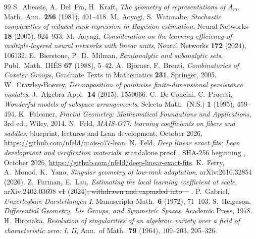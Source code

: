\documentclass[11pt,a4paper]{article}
\theoremstyle{definition}
\theoremstyle{remark}
\numberwithin{equation}{section}
\providecommand{\DIFdeltex}[1]{{\protect\color{red}\sout{#1}}} %
\providecommand{\DIFdelbegin}{} %
\providecommand{\DIFdelend}{} %
\providecommand{\DIFdel}[1]{\texorpdfstring{\DIFdeltex{#1}}{}} %
\begin{document}
\begin{thebibliography}{99}
 S.~Abeasis, A.~Del~Fra, H.~Kraft, \emph{The geometry of representations of $A_m$}, Math.\ Ann.\ \textbf{256} (1981), 401--418.
 M.~Aoyagi, S.~Watanabe, \emph{Stochastic complexities of reduced rank regression in Bayesian estimation}, Neural Networks \textbf{18} (2005), 924--933.
 M.~Aoyagi, \emph{Consideration on the learning efficiency of multiple-layered neural networks with linear units}, Neural Networks \textbf{172} (2024), 106132.
 E.~Bierstone, P.~D.~Milman, \emph{Semianalytic and subanalytic sets}, Publ.\ Math.\ IHÉS \textbf{67} (1988), 5--42.
 A.~Björner, F.~Brenti, \emph{Combinatorics of Coxeter Groups}, Graduate Texts in Mathematics \textbf{231}, Springer, 2005.
 W.~Crawley-Boevey, \emph{Decomposition of pointwise finite-dimensional persistence modules}, J.\ Algebra Appl.\ \textbf{14} (2015), 1550066.
 C.~De Concini, C.~Procesi, \emph{Wonderful models of subspace arrangements}, Selecta Math.\ (N.S.) \textbf{1} (1995), 459--494.
 K.~Falconer, \emph{Fractal Geometry: Mathematical Foundations and Applications}, 3rd ed., Wiley, 2014.
 N.~Feld, \emph{MAIS-O77: learning coefficients on fibers and saddles}, blueprint, lectures and Lean development, October 2026, \url{https://github.com/nfeld/mais-o77-lean}.
 N.~Feld, \emph{Deep linear exact fits: Lean development and verification materials}, standalone proof , SHA-256 beginning , October 2026, \url{https://github.com/nfeld/deep-linear-exact-fits}.
 K.~Ferry, A.~Monod, K.~Yano, \emph{Singular geometry of low-rank adaptation}, arXiv:2610.32854 (2026).
 Z.~Furman, E.~Lau, \emph{Estimating the local learning coefficient at scale}, arXiv:2402.03698 \DIFdelbegin \DIFdel{v1 }\DIFdelend (2024)\DIFdelbegin \DIFdel{; withdrawn and expanded into~\mbox{%
\cite{lau-llc}}\hskip0pt%
}\DIFdelend .
 P.~Gabriel, \emph{Unzerlegbare Darstellungen I}, Manuscripta Math.\ \textbf{6} (1972), 71--103.
 S.~Helgason, \emph{Differential Geometry, Lie Groups, and Symmetric Spaces}, Academic Press, 1978.
 H.~Hironaka, \emph{Resolution of singularities of an algebraic variety over a field of characteristic zero: I, II}, Ann.\ of Math.\ \textbf{79} (1964), 109--203, 205--326.

\end{thebibliography}
\end{document}
